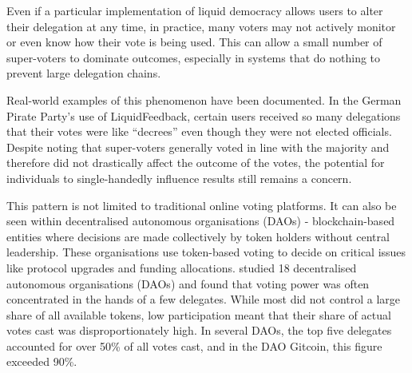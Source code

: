 Even if a particular implementation of liquid democracy allows users to alter their delegation at any time, in practice, many voters may not actively monitor or even know how their vote is being used. This can allow a small number of super-voters to dominate outcomes, especially in systems that do nothing to prevent large delegation chains.

Real-world examples of this phenomenon have been documented. In the German Pirate Party's use of LiquidFeedback, certain users received so many delegations that their votes were like ``decrees'' \citep{sven_becker_liquid_2012,kling2015votingbehaviourpoweronline} even though they were not elected officials.
Despite \citet{kling2015votingbehaviourpoweronline} noting that super-voters generally voted in line with the majority and therefore did not drastically affect the outcome of the votes, the potential for individuals to single-handedly influence results still remains a concern.

This pattern is not limited to traditional online voting platforms. It can also be seen within decentralised autonomous organisations (DAOs) - blockchain-based entities where decisions are made collectively by token holders without central leadership. These organisations use token-based voting to decide on critical issues like protocol upgrades and funding allocations. \citet{hallWhatHappensWhen2024} studied 18 decentralised autonomous organisations (DAOs) and found that voting power was often concentrated in the hands of a few delegates. While most did not control a large share of all available tokens, low participation meant that their share of actual votes cast was disproportionately high. In several DAOs, the top five delegates accounted for over 50\% of all votes cast, and in the DAO Gitcoin, this figure exceeded 90\%.

